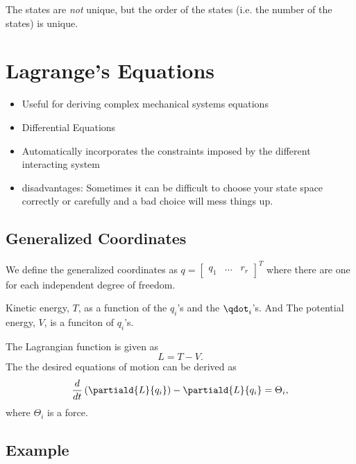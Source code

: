 \documentclass[10pt]{article}
\begin{document}
The states are \emph{not} unique, but the order of the states
(i.e. the number of the states) is unique.

\section{Lagrange's Equations}
\begin{itemize}
\item Useful for deriving complex mechanical systems equations
\item Differential Equations
\item Automatically incorporates the constraints imposed by the
  different interacting system
\item disadvantages: Sometimes it can be difficult to choose your
  state space correctly or carefully and a bad choice will mess things
  up. 
\end{itemize}

\subsection{Generalized Coordinates}
We define the generalized coordinates as 
$q =
\begin{bmatrix}
  q_1 & \dots & r_r
\end{bmatrix}^T$ where there are 
 one for each independent degree of freedom.

Kinetic energy, $T$, as a function of the $q_i$'s and the
$\qdot_i$'s. And The potential energy, $V$, is a funciton of $q_i$'s.

The Lagrangian function is given as
\begin{equation}
  L = T - V.
\end{equation}
The the desired equations of motion can be derived as
\begin{equation}
  \frac{d}{dt} \left(\partiald{L}{q_i}\right) - \partiald{L}{q_i} = \Theta_i,
\end{equation}
where $\Theta_i$ is a force.

\subsection{Example}

\end{document}
